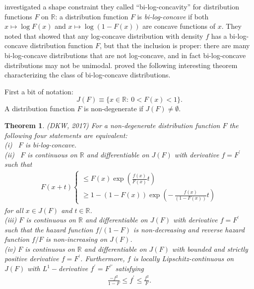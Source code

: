\documentclass[11pt]{amsart}
\numberwithin{equation}{section}
\newcommand{\RR}{\mathbb{R}}
\theoremstyle{definition}\newtheorem{definition}{Definition}
\theoremstyle{remark}\newtheorem{assumption}{Assumption}
\theoremstyle{remark}\newtheorem{remark}{Remark}
\theoremstyle{definition}\newtheorem{example}{Example}
\theoremstyle{plain}\newtheorem{question}{Question}
\theoremstyle{plain}\newtheorem{theorem}{Theorem}
\theoremstyle{plain}\newtheorem{lemma}{Lemma}
\theoremstyle{plain}\newtheorem{proposition}{Proposition}
\theoremstyle{plain}\newtheorem{corollary}{Corollary}
\theoremstyle{plain}\newtheorem{conjecture}{Conjecture}
\begin{document}
\cite{DuembgenKW:2017} %
investigated a shape constraint they called 
``bi-log-concavity'' for distribution functions $F$ on $\RR$:  a distribution function $F$ is 
{\sl bi-log-concave} if both $x \mapsto \log F(x) $ and $x \mapsto \log (1-F(x))$ are concave 
functions of $x$.  They noted 
that 
\cite{MR2213177} %
showed that any log-concave distribution with density $f$ 
has a bi-log-concave distribution function $F$, but that the inclusion is proper:  there are 
many bi-log-concave distributions that are not log-concave, and in fact bi-log-concave distributions
may not be unimodal.   
\cite{DuembgenKW:2017} %
proved the following interesting theorem characterizing 
the class of bi-log-concave distributions.
\medskip

First a bit of notation:  
$$
J(F) \equiv \{ x \in \RR : \ 0 < F(x) < 1 \} .
$$
A distribution function $F$ is non-degenerate if $J(F) \ne \emptyset $.
\smallskip
 
\begin{theorem}
\label{thm:DKWthm} (DKW, 2017)
For a non-degenerate distribution function $F$ the following 
four statements are equivalent:\\
(i) \ $F$ is bi-log-concave.\\
(ii) \ $F$ is continuous on $\RR$ and differentiable on $J(F)$ with derivative $f=F^{\prime}$ such that
\begin{eqnarray*}
F(x+t) \left \{ \begin{array}{l}  \le F(x) \exp \left ( \frac{f(x)}{F(x)} t \right ) \\ \ge 1 - (1-F(x)) \exp \left ( - \, \frac{f(x)}{(1-F(x))}  t \right ) 
\end{array} \right .
\end{eqnarray*}
for all $x \in J(F)$ and $t \in \RR$.\\
(iii) $F$ is continuous on $\RR$ and differentiable on $J(F)$ with derivative $f = F^{\prime}$ such that the 
hazard function $f/(1-F)$ is non-decreasing and reverse hazard function $f/F$ is non-increasing on $J(F)$.\\
(iv) $F$ is continuous on $\RR$ and differentiable on $J(F)$ with bounded 
and strictly positive derivative $f = F^{\prime}$.  Furthermore, $f$ is locally Lipschitz-continuous on $J(F)$ with 
$L^1-$derivative  $f^{\prime} = F^{\prime \prime} $ satisfying 
\begin{eqnarray*}
\frac{-f^2}{1-F} \le f^{\prime} \le \frac{f^2}{F} .
\end{eqnarray*}
\end{theorem}
\end{document}
